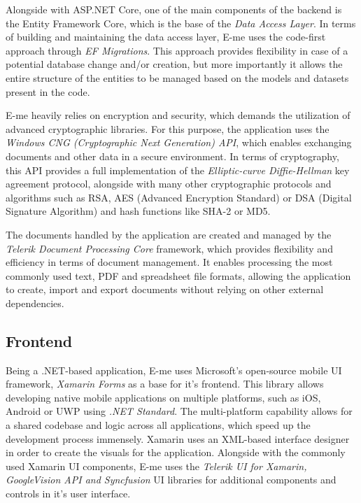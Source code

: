 Alongside with ASP.NET Core, one of the main components of the backend is the Entity Framework Core, which is the base of the 
\emph{Data Access Layer}.
In terms of building and maintaining the data access layer, E-me uses the code-first approach through \emph{EF Migrations}.
This approach provides flexibility in case of a potential database change and/or creation, but more importantly it allows 
the entire structure of the entities to be managed based on the models and datasets present in the code.

E-me heavily relies on encryption and security, which demands the utilization of advanced cryptographic libraries.
For this purpose, the application uses the \emph{Windows CNG (Cryptographic Next Generation) API}, which
enables exchanging documents and other data in a secure environment.
In terms of cryptography, this API provides a full implementation of the \emph{Elliptic-curve Diffie-Hellman} key agreement protocol,
alongside with many other cryptographic protocols and algorithms such as RSA, AES (Advanced Encryption Standard) or DSA (Digital Signature Algorithm)
and hash functions like SHA-2 or MD5.

The documents handled by the application are created and managed by the \emph{Telerik Document Processing Core} framework, which
provides flexibility and efficiency in terms of document management. 
It enables processing the most commonly used text, PDF and spreadsheet file formats, allowing the application
to create, import and export documents without relying on other external dependencies.

\subsection{Frontend}

Being a .NET-based application, E-me uses Microsoft's open-source mobile UI framework, \emph{Xamarin Forms} as a base for it's frontend.
This library allows developing native mobile applications on multiple platforms, such as iOS, Android or UWP using \emph{.NET Standard}. 
The multi-platform capability allows for a shared codebase and logic across all applications, which speed up the development process immensely.
Xamarin uses an XML-based interface designer in order to create the visuals for the application.
Alongside with the commonly used Xamarin UI components, E-me uses the \emph{Telerik UI for Xamarin, GoogleVision API and Syncfusion} UI
libraries for additional components and controls in it's user interface.



